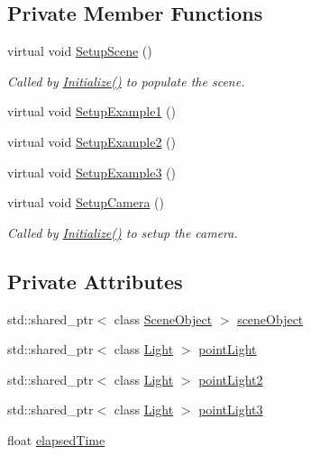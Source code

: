\subsection*{Private Member Functions}
\begin{DoxyCompactItemize}
\item 
virtual void \hyperlink{class_assignment2_aa4f8ccd09a7accbdf093394c6ee4f63f}{Setup\+Scene} ()
\begin{DoxyCompactList}\small\item\em Called by \hyperlink{class_application_a17cf1ea4552d26a1c20f7d98d793d41d}{Initialize()} to populate the scene. \end{DoxyCompactList}\item 
virtual void \hyperlink{class_assignment2_a2f42c6da59d8b5ba5dc4796d8bd13d30}{Setup\+Example1} ()
\item 
virtual void \hyperlink{class_assignment2_aa26c3cd3e97be7ef88aae8d26d4af6bc}{Setup\+Example2} ()
\item 
virtual void \hyperlink{class_assignment2_a72e9b3939215d9a93bf5dc2090b35410}{Setup\+Example3} ()
\item 
virtual void \hyperlink{class_assignment2_ab9ace1ffdac8f7425c64d661f3d13acd}{Setup\+Camera} ()
\begin{DoxyCompactList}\small\item\em Called by \hyperlink{class_application_a17cf1ea4552d26a1c20f7d98d793d41d}{Initialize()} to setup the camera. \end{DoxyCompactList}\end{DoxyCompactItemize}
\subsection*{Private Attributes}
\begin{DoxyCompactItemize}
\item 
std\+::shared\+\_\+ptr$<$ class \hyperlink{class_scene_object}{Scene\+Object} $>$ \hyperlink{class_assignment2_a3afcc7cf71f0b1eb855482057beb1146}{scene\+Object}
\item 
std\+::shared\+\_\+ptr$<$ class \hyperlink{class_light}{Light} $>$ \hyperlink{class_assignment2_abaf6127e0de097717673c0d9b04f8c79}{point\+Light}
\item 
std\+::shared\+\_\+ptr$<$ class \hyperlink{class_light}{Light} $>$ \hyperlink{class_assignment2_adad4306da57243fada86a48e4edd7063}{point\+Light2}
\item 
std\+::shared\+\_\+ptr$<$ class \hyperlink{class_light}{Light} $>$ \hyperlink{class_assignment2_a23856ba0cbb408090482755bb636a567}{point\+Light3}
\item 
float \hyperlink{class_assignment2_a1406a4603687f934feca8cf72a850bd5}{elapsed\+Time}
\end{DoxyCompactItemize}
